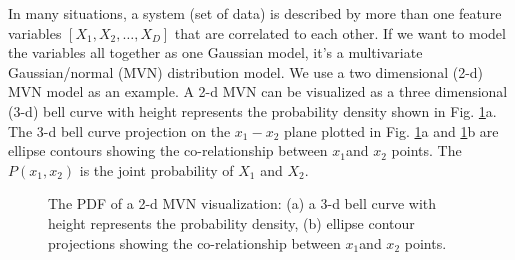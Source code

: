\documentclass[12pt,letterpaper,fleqn,oneside,titlepage]{offroad-report}
\begin{document}
In many situations, a system (set of data) is described by more than one feature variables $[X_1, X_2, \ldots, X_D]$ that are correlated to each other. If we want to model the variables all together as one Gaussian model, it's a multivariate Gaussian/normal (MVN) \cite{Murphy2012} distribution model. We use a two dimensional (2-d) MVN model as an example. A 2-d MVN can be visualized as a three dimensional (3-d) bell curve with height represents the probability density shown in Fig. \ref{FIG:5}a. The 3-d bell curve projection on the $x_1-x_2$ plane plotted in Fig. \ref{FIG:5}a and \ref{FIG:5}b are ellipse contours showing the co-relationship between $x_1$and $x_2$ points. The $P(x_1, x_2)$ is the joint probability of $X_1$ and $X_2$. 
\begin{figure}[h!]
    \centering
    \qquad
    \caption{The PDF of a 2-d MVN visualization: (a) a 3-d bell curve with height represents the probability density, (b) ellipse contour projections showing the co-relationship between $x_1$and $x_2$ points.}%
    \label{FIG:5}
\end{figure}
\end{document}
